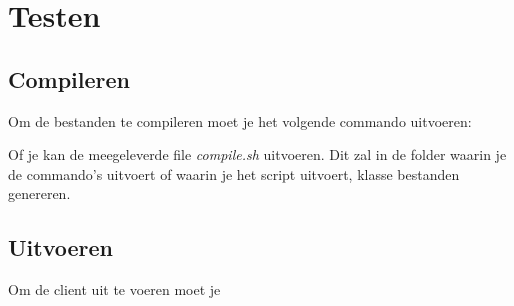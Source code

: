 \documentclass{article}
\begin{document}
\section{Testen}\label{test}
\subsection{Compileren}
Om de bestanden te compileren moet je het volgende commando uitvoeren:

Of je kan de meegeleverde file \emph{compile.sh} uitvoeren. Dit zal in de folder waarin je de commando's uitvoert of waarin je het script uitvoert, klasse bestanden genereren.
\subsection{Uitvoeren}
Om de client uit te voeren moet je 
\end{document}
